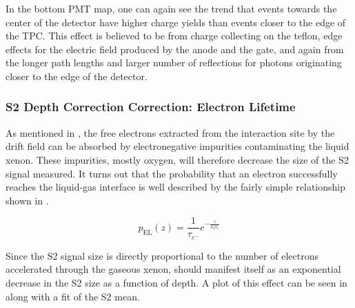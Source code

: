 In the bottom PMT map, one can again see the trend that events towards the center of the detector have higher charge yields than events closer to the edge of the TPC.  This effect is believed to be from charge collecting on the teflon, edge effects for the electric field produced by the anode and the gate, and again from the longer path lengths and larger number of reflections for photons originating closer to the edge of the detector.


\subsubsection{S2 Depth Correction Correction: Electron Lifetime}
\label{sec:xe1t_depth_correction}

As mentioned in , the free electrons extracted from the interaction site by the drift field can be absorbed by electronegative impurities contaminating the liquid xenon.  These impurities, mostly oxygen, will therefore decrease the size of the S2 signal measured.  It turns out that the probability that an electron successfully reaches the liquid-gas interface is well described by the fairly simple relationship shown in .

\begin{equation}
        \label{eqn:xe1t_electron_lifetime}
        p_{\textrm{EL}}(z) = \frac{1}{\tau_{e^-}} e^{-\frac{z}{v_d \tau_{e}}}
\end{equation} 

Since the S2 signal size is directly proportional to the number of electrons accelerated through the gaseous xenon,  should manifest itself as an exponential decrease in the S2 size as a function of depth.  A plot of this effect can be seen in  along with a fit of the S2 mean.


